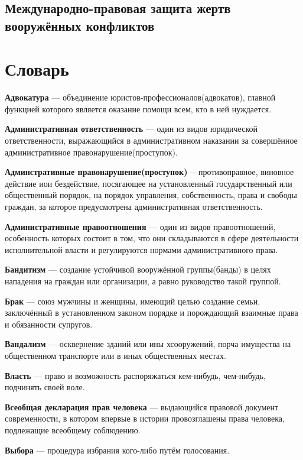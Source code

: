 \documentclass[a4paper, 12pt]{article}
\begin{document}
        \subsection{Международно-правовая защита жертв вооружённых конфликтов}
    \section{Словарь}
        \textbf{Адвокатура} --- объединение юристов-профессионалов(адвокатов), главной функцией которого является оказание помощи всем, кто в ней нуждается. \par
        \textbf{Административная ответственность} --- один из видов юридической ответственности, выражающийся в административном наказании за совершённое административное правонарушение(проступок). \par
        \textbf{Админстративные правонарушение(проступок)} ---противоправное, виновное действие иои бездействие, посягающее на установленный государственный или общественный порядок, на порядок управления, собственность, права и свободы граждан, за которое предусмотрена административная ответственность. \par
        \textbf{Административные правоотношения} --- один из видов правоотношений, особенность которых состоит в том, что они складываются в сфере деятельности исполнительной власти и регулируются нормами административного права. \par
        \textbf{Бандитизм} --- создание устойчивой вооружённой группы(банды) в целях нападения на граждан или организации, а равно руководство такой группой. \par
        \textbf{Брак} --- союз мужчины и женщины, имеющий целью создание семьи, заключённый в установленном законом порядке и порождающий взаимные права и обязанности супругов. \par
        \textbf{Вандализм} --- осквернение зданий или ины хсооружений, порча имущества на общественном транспорте или в иных общественных местах. \par
        \textbf{Власть} --- право и возможность распоряжаться кем-нибудь, чем-нибудь, подчинять своей воле. \par
        \textbf{Всеобщая декларация прав человека} --- выдающийся правовой документ современности, в котором впервые в истории провозглашены права человека, подлежащие всеобщему соблюдению. \par
        \textbf{Выбора} --- процедура избрания кого-либо путём голосования. \par
\end{document}
